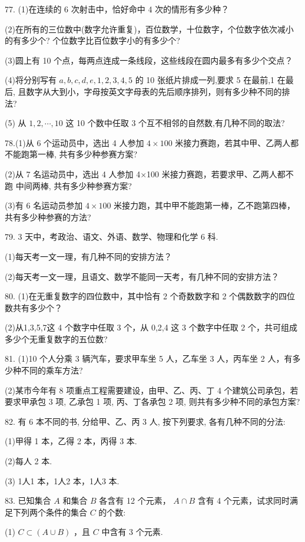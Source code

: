 \documentclass[10pt]{article}
\begin{document}
77. (1)在连续的 6 次射击中，恰好命中 4 次的情形有多少种？

(2)在所有的三位数中(数字允许重复)，百位数学，十位数字，个位数字依次减小的有多少个? 个位数字比百位数字小的有多少个?

(3)圆上有 10 个点，每两点连成一条线段，这些线段在圆内最多有多少个交点？

(4)将分别写有 \(a,b,c,d,e,1,2,3,4,5\) 的 10 张纸片排成一列,要求 5 在最前,1 在最后, 且数字从大到小，字母按英文字母表的先后顺序排列，则有多少种不同的排法?

(5) 从 \(1,2,\cdots ,{10}\) 这 10 个数中任取 3 个互不相邻的自然数,有几种不同的取法?

78.(1)从 6 个运动员中，选出 4 人参加 \(4 \times  {100}\) 米接力赛跑，若其中甲、乙两人都不能跑第一棒, 共有多少种参赛方案?

(2)从 7 名运动员中，选出 4 人参加 4×100 米接力赛跑，若要求甲、乙两人都不跑 中间两棒, 共有多少种参赛方案?

(3)有 6 名运动员参加 \(4 \times  {100}\) 米接力跑，其中甲不能跑第一棒，乙不跑第四棒，共有多少种参赛的方法?

79. 3 天中，考政治、语文、外语、数学、物理和化学 6 科.

(1)每天考一文一理，有几种不同的安排方法？

(2)每天考一文一理，且语文、数学不能同一天考，有几种不同的安排方法？

80. (1)在无重复数字的四位数中，其中恰有 2 个奇数数字和 2 个偶数数字的四位数共有多少个？

(2)从1,3,5,7这 4 个数字中任取 3 个，从 0,2,4 这 3 个数字中任取 2 个，共可组成多少个无重复数字的五位数?

81. (1)10 个人分乘 3 辆汽车，要求甲车坐 5 人，乙车坐 3 人，丙车坐 2 人，有多少种不同的乘车方法?

(2)某市今年有 8 项重点工程需要建设，由甲、乙、丙、丁 4 个建筑公司承包，若要求甲承包 3 项, 乙承包 1 项, 丙、丁各承包 2 项, 则共有多少种不同的承包方案?

82. 有 6 本不同的书, 分给甲、乙、丙 3 人, 按下列要求, 各有几种不同的分法:

(1)甲得 1 本，乙得 2 本，丙得 3 本.

(2)每人 2 本.

(3) 1人1 本，1人2 本，1人3 本.

83. 已知集合 \(A\) 和集合 \(B\) 各含有 12 个元素， \(A \cap  B\) 含有 4 个元素，试求同时满足下列两个条件的集合 \(C\) 的个数:

(1) \(C \subset  \left( {A \cup  B}\right)\) ，且 \(C\) 中含有 3 个元素.
\end{document}
